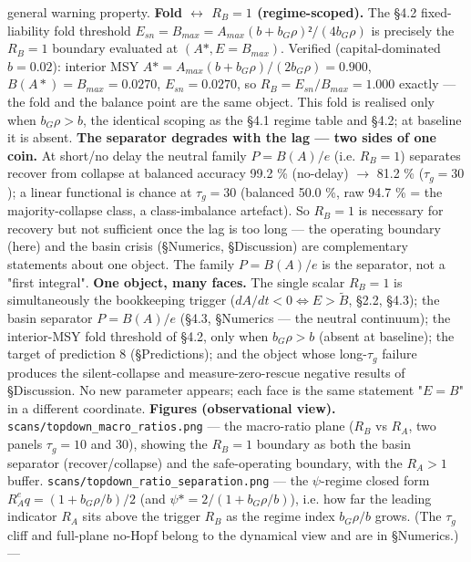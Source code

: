 \documentclass[11pt]{article}
\begin{document}
general warning property. \textbf{Fold \ensuremath{\leftrightarrow{}} $R_{B} = 1$ (regime-scoped).} The §4.2 fixed-liability fold threshold $E_{sn} = B_{max} = A_{max}(b+b_{G}\rho{})²/(4b_{G}\rho{})$ is precisely the $R_{B} = 1$ boundary evaluated at $(A*, E = B_{max})$. Verified (capital-dominated $b = 0.02$): interior MSY $A* = A_{max}(b+b_{G}\rho{})/(2b_{G}\rho{}) = 0.900$, $B(A*) = B_{max} = 0.0270$, $E_{sn} = 0.0270$, so $R_{B} = E_{sn}/B_{max} = 1.000$ exactly — the fold and the balance point are the same object. This fold is realised only when $b_{G}\rho{} > b$, the identical scoping as the §4.1 regime table and §4.2; at baseline it is absent. \textbf{The separator degrades with the lag — two sides of one coin.} At short/no delay the neutral family $P = B(A)/e$ (i.e. $R_{B} = 1$) separates recover from collapse at balanced accuracy 99.2 \% (no-delay) \ensuremath{\to{}} 81.2 \% ($\tau{}_{g} = 30$); a linear functional is chance at $\tau{}_{g} = 30$ (balanced 50.0 \%, raw 94.7 \% = the majority-collapse class, a class-imbalance artefact). So $R_{B} = 1$ is necessary for recovery but not sufficient once the lag is too long — the operating boundary (here) and the basin crisis (§Numerics, §Discussion) are complementary statements about one object. The family $P = B(A)/e$ is the separator, not a "first integral". \textbf{One object, many faces.} The single scalar $R_{B} = 1$ is simultaneously the bookkeeping trigger ($dA/dt < 0 \iff{} E > \tilde{B}$, §2.2, §4.3); the basin separator $P = B(A)/e$ (§4.3, §Numerics — the neutral continuum); the interior-MSY fold threshold of §4.2, only when $b_{G}\rho{} > b$ (absent at baseline); the target of prediction 8 (§Predictions); and the object whose long-$\tau{}_{g}$ failure produces the silent-collapse and measure-zero-rescue negative results of §Discussion. No new parameter appears; each face is the same statement "$E = B$" in a different coordinate. \textbf{Figures (observational view).} \texttt{scans/topdown\_macro\_ratios.png} — the macro-ratio plane ($R_{B}$ vs $R_{A}$, two panels $\tau{}_{g}=10$ and 30), showing the $R_{B}=1$ boundary as both the basin separator (recover/collapse) and the safe-operating boundary, with the $R_{A}>1$ buffer. \texttt{scans/topdown\_ratio\_separation.png} — the \ensuremath{\psi{}}-regime closed form $R_{A}^eq=(1+b_{G}\rho{}/b)/2$ (and $\psi{}*=2/(1+b_{G}\rho{}/b)$), i.e. how far the leading indicator $R_{A}$ sits above the trigger $R_{B}$ as the regime index $b_{G}\rho{}/b$ grows. (The $\tau{}_{g}$ cliff and full-plane no-Hopf belong to the dynamical view and are in §Numerics.) ---
\end{document}

